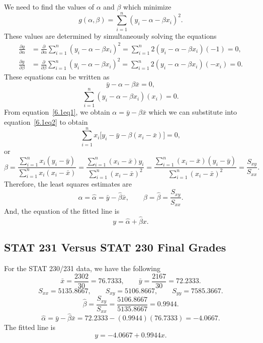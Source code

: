 \documentclass[oneside]{book}\usepackage[]{graphicx}\usepackage[]{color}
\begin{document}
We need to find the values of $ \alpha $ and $ \beta $ which minimize
\[g(\alpha, \beta)=\sum_{i=1}^{n}(y_{i}-\alpha-\beta x_{i})^{2}.\]
These values are determined by simultaneously solving the equations
\begin{align*}
    \frac{\partial g}{\partial \alpha} & =\frac{\partial}{\partial \alpha} \sum_{i=1}^{n}(y_{i}-\alpha-\beta x_{i})^{2}=\sum_{i=1}^{n} 2(y_{i}-\alpha-\beta x_{i})(-1)=0,    \\
    \frac{\partial g}{\partial \beta}  & =\frac{\partial}{\partial \beta} \sum_{i=1}^{n}(y_{i}-\alpha-\beta x_{i})^{2}=\sum_{i=1}^{n} 2(y_{i}-\alpha-\beta x_{i})(-x_{i})=0.
\end{align*}
These equations can be written as
\begin{equation}\tag*{(1)}\label{6.1eq1}
    \bar{y}-\alpha-\beta \bar{x}=0,
\end{equation}
\begin{equation}\tag*{(2)}\label{6.1eq2}
    \sum_{i=1}^{n}(y_{i}-\alpha-\beta x_{i})(x_{i})=0.
\end{equation}
From equation~\ref{6.1eq1}, we obtain $ \alpha=\bar{y}-\beta \bar{x} $ which
we can substitute into equation~\ref{6.1eq2} to obtain
\[\sum_{i=1}^{n} x_{i}\bigl[y_{i}-\bar{y}-\beta(x_{i}-\bar{x})\bigr]=0,\]
or
\[\beta=
    \frac{\sum\limits_{i=1}^{n} x_{i}(y_{i}-\bar{y})}
    {\sum\limits_{i=1}^{n} x_{i}(x_{i}-\bar{x})}
    =\frac{\sum\limits_{i=1}^{n}(x_{i}-\bar{x}) y_{i}}
    {\sum\limits_{i=1}^{n}(x_{i}-\bar{x})^{2}}
    =\frac{\sum\limits_{i=1}^{n}(x_{i}-\bar{x})(y_{i}-\bar{y})}
    {\sum\limits_{i=1}^{n}(x_{i}-\bar{x})^{2}}
    =\frac{S_{x y}}{S_{x x}}.\]
Therefore, the least squares estimates are
\[\alpha=\hat{\alpha}=\bar{y}-\hat{\beta} \bar{x},
    \qquad \beta=\hat{\beta}=\frac{S_{x y}}{S_{x x}}.\]
And, the equation of the fitted line is
\[y=\hat{\alpha}+\hat{\beta} x.\]
\subsection{STAT 231 Versus STAT 230 Final Grades}
For the STAT 230/231 data, we have the following
\[\bar{x}=\frac{2302}{30}=76.7333,\qquad\bar{y}=\frac{2167}{30}=72.2333.\]
\[S_{x x}=5135.8667,\qquad S_{x y}=5106.8667,\qquad S_{y y}=7585.3667.\]
\[\hat{\beta}=\frac{S_{x y}}{S_{x x}}=\frac{5106.8667}{5135.8667}=0.9944.\]
\[\hat{\alpha}=\bar{y}-\hat{\beta} \bar{x}=72.2333-(0.9944)(76.7333)=-4.0667.\]
The fitted line is
\[y=-4.0667+0.9944 x.\]
\end{document}
